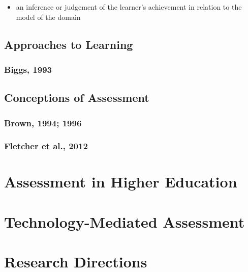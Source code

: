 \documentclass[
]{book}
\providecommand{\tightlist}{%
  \setlength{\itemsep}{0pt}\setlength{\parskip}{0pt}}
\begin{document}
\begin{itemize}
\tightlist
\item
  an inference or judgement of the learner's achievement in relation to the model of the domain
\end{itemize}

\hypertarget{approaches-to-learning}{%
\subsection*{Approaches to Learning}\label{approaches-to-learning}}

\hypertarget{biggs-1993}{%
\subsubsection*{Biggs, 1993}\label{biggs-1993}}

\hypertarget{conceptions-of-assessment}{%
\subsection*{Conceptions of Assessment}\label{conceptions-of-assessment}}

\hypertarget{brown-1994-1996}{%
\subsubsection*{Brown, 1994; 1996}\label{brown-1994-1996}}

\hypertarget{fletcher-et-al.-2012}{%
\subsubsection*{Fletcher et al., 2012}\label{fletcher-et-al.-2012}}

\hypertarget{assessment-in-higher-education}{%
\section*{Assessment in Higher Education}\label{assessment-in-higher-education}}

\hypertarget{technology-mediated-assessment}{%
\section*{Technology-Mediated Assessment}\label{technology-mediated-assessment}}

\hypertarget{research-directions}{%
\section*{Research Directions}\label{research-directions}}

  
\end{document}
